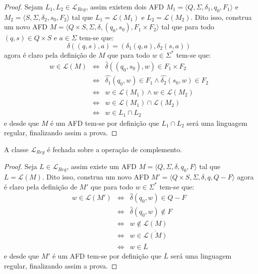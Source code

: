 \begin{proof}
	Sejam $L_1, L_2 \in \mathcal{L}_{Reg}$, assim existem dois AFD $M_1 = \langle Q, \Sigma, \delta_1, q_0, F_1\rangle$ e $M_2 = \langle S, \Sigma, \delta_2, s_0, F_2\rangle$ tal que $L_1 = \mathcal{L}(M_1)$ e $L_2 = \mathcal{L}(M_2)$. Dito isso, construa um novo AFD $M = \langle Q \times S, \Sigma, \delta, (q_0, s_0), F_1 \times F_2 \rangle$ tal que para todo $(q, s) \in Q \times S$ e $a \in \Sigma$ tem-se que:
	$$\delta((q, s), a) = (\delta_1(q, a), \delta_2(s, a))$$
	agora é claro pela definição de $M$ que para todo $w \in \Sigma^*$ tem-se que:
	\begin{eqnarray*}
		w \in \mathcal{L}(M) & \Longleftrightarrow & \widehat{\delta}((q_0, s_0), w) \in F_1 \times F_2\\
		& \Longleftrightarrow & \widehat{\delta_1}(q_0, w) \in F_1 \land \widehat{\delta_2}(s_0, w) \in F_2\\
		& \Longleftrightarrow & w \in \mathcal{L}(M_1) \land w \in \mathcal{L}(M_2)\\
		& \Longleftrightarrow & w \in \mathcal{L}(M_1) \cap \mathcal{L}(M_2)\\
		& \Longleftrightarrow & w \in L_1 \cap L_2
	\end{eqnarray*}
	e desde que $M$ é um AFD tem-se por definição que $L_1 \cap L_2$ será uma linguagem regular, finalizando assim a prova.
\end{proof}

\begin{teorema}\label{teo:FechoRegC}
	A classe $\mathcal{L}_{Reg}$ é fechada sobre a operação de complemento.
\end{teorema}

\begin{proof}
	Seja $L \in \mathcal{L}_{Reg}$, assim existe um AFD $M = \langle Q, \Sigma, \delta, q_0, F\rangle$ tal que $L = \mathcal{L}(M)$. Dito isso, construa um novo AFD $M' = \langle Q \times S, \Sigma, \delta, q, Q - F \rangle$
	agora é claro pela definição de $M'$ que para todo $w \in \Sigma^*$ tem-se que:
	\begin{eqnarray*}
		w \in \mathcal{L}(M') & \Longleftrightarrow & \widehat{\delta}(q_0, w) \in Q - F\\
		& \Longleftrightarrow & \widehat{\delta}(q_0, w) \notin F\\
		& \Longleftrightarrow & w \notin \mathcal{L}(M)\\
		& \Longleftrightarrow & w \in \overline{\mathcal{L}(M)}\\
		& \Longleftrightarrow & w \in \overline{L}
	\end{eqnarray*}
	e desde que $M'$ é um AFD tem-se por definição que $\overline{L}$ será uma linguagem regular, finalizando assim a prova.
\end{proof}

